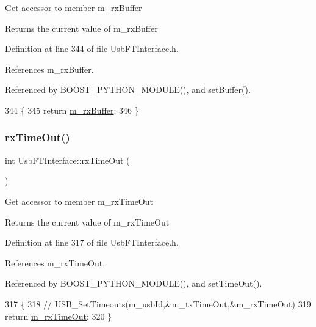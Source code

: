 Get accessor to member m\+\_\+rx\+Buffer \begin{DoxyReturn}{Returns}
the current value of m\+\_\+rx\+Buffer 
\end{DoxyReturn}


Definition at line 344 of file Usb\+F\+T\+Interface.\+h.



References m\+\_\+rx\+Buffer.



Referenced by B\+O\+O\+S\+T\+\_\+\+P\+Y\+T\+H\+O\+N\+\_\+\+M\+O\+D\+U\+L\+E(), and set\+Buffer().


\begin{DoxyCode}
344                   \{
345     \textcolor{keywordflow}{return} \hyperlink{classUsbFTInterface_a7007c5112d381f5caefa133a42bd900d}{m\_rxBuffer};
346   \}
\end{DoxyCode}
\mbox{\label{classUsbFTInterface_ad95ffb87539ca86882e26fa24b00de97}} 
\subsubsection{\texorpdfstring{rx\+Time\+Out()}{rxTimeOut()}}
{\footnotesize\ttfamily int Usb\+F\+T\+Interface\+::rx\+Time\+Out (\begin{DoxyParamCaption}{ }\end{DoxyParamCaption})\hspace{0.3cm}{\ttfamily [inline]}}

Get accessor to member m\+\_\+rx\+Time\+Out \begin{DoxyReturn}{Returns}
the current value of m\+\_\+rx\+Time\+Out 
\end{DoxyReturn}


Definition at line 317 of file Usb\+F\+T\+Interface.\+h.



References m\+\_\+rx\+Time\+Out.



Referenced by B\+O\+O\+S\+T\+\_\+\+P\+Y\+T\+H\+O\+N\+\_\+\+M\+O\+D\+U\+L\+E(), and set\+Time\+Out().


\begin{DoxyCode}
317                    \{
318     \textcolor{comment}{//    USB\_SetTimeouts(m\_usbId,&m\_txTimeOut,&m\_rxTimeOut)}
319     \textcolor{keywordflow}{return} \hyperlink{classUsbFTInterface_a0153d99857eaa634e4b9fc1ec58caf52}{m\_rxTimeOut};
320   \}
\end{DoxyCode}
\mbox{\label{classUsbFTInterface_ab4a2aa9664e903c57ae396faf643e7a3}} 
